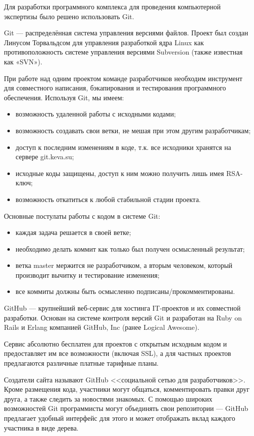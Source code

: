 Для разработки программного комплекса для проведения компьютерной экспертизы было решено использовать Git.

Git --- распределённая система управления версиями файлов. Проект был создан Линусом Торвальдсом для управления разработкой ядра Linux  как противоположность  системе управления версиями Subversion (также известная как «SVN»). \cite{progit}

При работе над одним проектом команде разработчиков необходим инструмент для совместного написания, бэкапирования и тестирования программного обеспечения. Используя Git, мы имеем:
\begin{itemize}
\item возможность удаленной работы с исходными кодами;
\item возможность создавать свои ветки, не мешая при этом другим разработчикам;
\item доступ к последним изменениям в коде, т.к. все исходники хранятся на сервере git.keva.su;
\item исходные коды защищены, доступ к ним можно получить лишь имея RSA-ключ;
\item возможность откатиться к любой стабильной стадии проекта.
\end{itemize}

Основные постулаты работы с кодом в системе Git:

\begin{itemize}
\item каждая задача решается в своей ветке;
\item необходимо делать коммит как только был получен осмысленный результат;
\item ветка master мержится не разработчиком, а вторым человеком, который производит вычитку и тестирование изменения;
\item все коммиты должны быть осмысленно подписаны/прокомментированы.
\end{itemize}

GitHub ---  крупнейший веб-сервис для хостинга IT-проектов и их совместной разработки. Основан на системе контроля версий Git и разработан на Ruby on Rails и Erlang компанией GitHub, Inc (ранее Logical Awesome).

Сервис абсолютно бесплатен для проектов с открытым исходным кодом и предоставляет им все возможности (включая SSL), а для частных проектов предлагаются различные платные тарифные планы.\cite{github} 

Создатели сайта называют GitHub <<социальной сетью для разработчиков>>. Кроме размещения кода, участники могут общаться, комментировать правки друг друга, а также следить за новостями знакомых. С помощью широких возможностей Git программисты могут объединять свои репозитории — GitHub предлагает удобный интерфейс для этого и может отображать вклад каждого участника в виде дерева.

